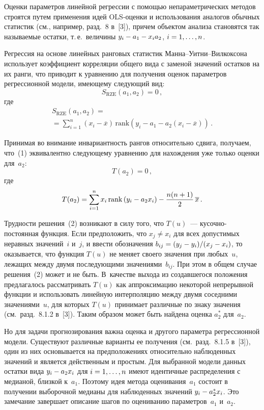 \begin{multicols}{2}
     Оценки параметров линейной регрессии с помощью непараметрических
методов строятся путем применения идей OLS-оцен\-ки и использования
аналогов обычных статистик (см., например, разд.~8 в~[3]), причем объектом
анализа становятся так называемые остатки, т.\,е.\ величины $y_i\hm - a_1 \hm-
x_i a_2$, $i\hm= 1, \ldots , n$.

     Регрессия на основе линейных ранговых ста\-тистик
     Ман\-на--Уит\-ни--Вил\-кок\-со\-на использует ко\-эффициент корреляции
общего вида с заменой значе\-ний остатков на их ранги, что приводит к
уравнению для получения оценок параметров регрессионной модели,
имеющему следующий вид:
     \begin{equation}
     S_{\mathrm{RZE}} (a_1, a_2)=0\,,
     \label{e1-kri}
     \end{equation}
где
\begin{multline*}
S_{\mathrm{RZE}}(a_1, a_2) = {}\\
{}=\sum\limits_{i=1}^n (x_i- \overline{x}) \,
\mathrm{rank} \left( y_i -a_1 -a_2 (x_i-\overline{x} )\right)\,.
\end{multline*}

     Принимая во внимание инвариантность рангов относительно сдвига,
получаем, что~(1) эквивалентно следующему уравнению для нахождения уже
только оценки для~$a_2$:
     \begin{equation}
     T(a_2) =0\,,
     \label{e2-kri}
     \end{equation}
где
$$
T(a_2) = \sum\limits_{i=1}^n x_i\,\mathrm{rank}\left( y_i -a_2 x_i\right) -
\displaystyle\frac{\displaystyle n(n+1)\mathstrut}{\displaystyle 2\mathstrut}\,\overline{x}\,.
$$

     Трудности решения~(2) возникают в силу того, что $T(u)$~---
     ку\-соч\-но-по\-сто\-ян\-ная функция. Если предположить, что $x_j\not=
x_i$ для всех допустимых неравных значений~$i$ и~$j$, и ввести обозначения
$b_{ij} \hm = (y_j-y_i)/(x_j-x_i)$, то оказывается, что функция $T(u)$ не меняет
своего значения при любых~$u$, лежащих между двумя последующими
значениями~$b_{ij}$. При этом в общем случае решения~(2) может и не быть.
В~качестве выхода из создавшегося положения предлагалось рассматривать
$T(u)$ как аппроксимацию некоторой непрерывной функции и использовать
линейную интерполяцию между двумя соседними значениями~$u$, для
которых $T(u)$ принимает различные по знаку значения (см.\ разд.~8.1.2 в~[3]).
Таким образом может быть найдена оценка $a_2^*$ для~$a_2$.

     Но для задачи прогнозирования важна оценка и другого параметра
регрессионной модели. Существуют различные варианты ее получения (см.\
разд.~8.1.5 в~[3]), один из них основывается на предположениях относительно
наблюденных значений и является действенным и простым. Для выбранной
модели данных остатки вида $y_i \hm- a_2 x_i$ для $i\hm= 1, \ldots ,n$ имеют
идентичные распределения с медианой, близкой к~$a_1$. Поэтому идея метода
оценивания~$a_1$ состоит в получении выборочной медианы для
наблюденных значений $y_i\hm- a_2^*x_i$. Это замечание завершает описание
шагов по оцениванию параметров~$a_1$ и~$a_2$.


\end{multicols}
